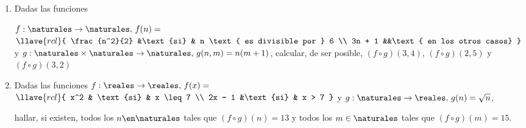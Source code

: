 \begin{enunciado}{\ejercicio}
  \begin{enumerate}[label=\roman*)]
    \item Dadas las funciones

          $f : \naturales \to \naturales, \, f(n)= $
          $
            \llave{rcl}{
              \frac{n^2}{2} &\text{si} & n \text{ es divisible por } 6 \\
              3n + 1 &&\text{ en los otros casos}
            }
          $
          y
          $g : \naturales \times \naturales \to \naturales, \, g(n,m) = n(m + 1)$,
          calcular, de ser posible, $(f \circ g)(3, 4)$, $(f \circ g)(2, 5)$ y $(f \circ g)(3, 2)$

    \item Dadas las funciones
          $f : \reales \to \reales, \, f(x)= $
          $
            \llave{rcl}{
              x^2 & \text{si} & x \leq 7 \\
              2x - 1 &\text{si} & x > 7
            }
          $
          y
          $g : \naturales \to \reales, \, g(n) = \sqrt{n}$,

          hallar, si existen, todos los $n \en \naturales$ tales que $(f \circ g)(n) = 13$ y todos los
          $m \in \naturales$ tales que $(f \circ g)(m) = 15$.
  \end{enumerate}
\end{enunciado}


